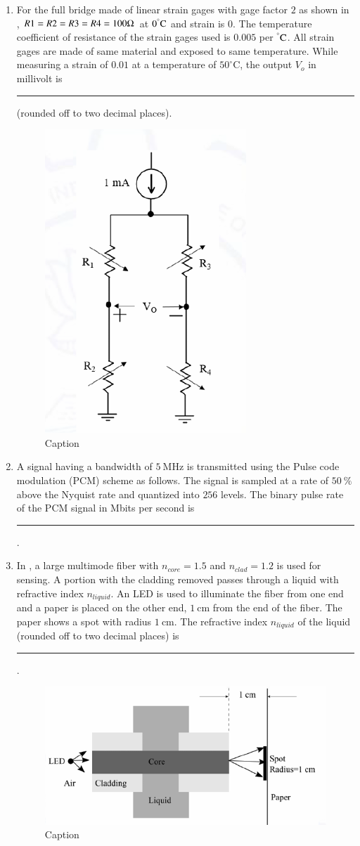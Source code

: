 \documentclass[journal,12pt,onecolumn]{IEEEtran}
\theoremstyle{remark}
\begin{document}
\begin{enumerate}
\item For the full bridge made of linear strain gages with gage factor $2$ as shown in , $R1 = R2 = R3 = R4 = 100\ohm$ at $0^\degree\text{C}$ and strain is $0$. The temperature coefficient of resistance of the strain gages used is $0.005$ per $^\degree \text{C}$.
All strain gages are made of same material and exposed to same
temperature. While measuring a strain of $0.01$ at a temperature of $50^\circ \text{C}$, the
output $V_o$ in millivolt is \rule{1.5cm}{0.4pt} (rounded off to two decimal places). \par \hfill{}
\begin{figure}[H]
    \centering
    \includegraphics[width=0.3\linewidth]{Figs/Q-53.png}
    \caption{Caption}
    \label{53}
\end{figure}

\item A signal having a bandwidth of $5\ \text{MHz}$ is transmitted using the Pulse code modulation (PCM) scheme as follows. The signal is sampled at a rate of $50\ \%$ above the Nyquist rate and quantized into $256$ levels. The binary pulse rate of the PCM signal in Mbits per second is \rule{1.5cm}{0.4pt}. \par \hfill{}

\item In , a large multimode fiber with $n_{core} = 1.5$ and $n_{clad} =1.2$ is used for sensing. A portion with the cladding removed passes through a liquid with refractive index $n_{liquid}$. An LED is used to illuminate the fiber from one end and a paper is placed on the other end, $1\ \text{cm}$ from the end of the fiber. The paper shows a spot with radius $1\ \text{cm}$. The refractive index $n_{liquid}$ of the liquid (rounded off to two decimal places) is \rule{1.5cm}{0.4pt}. \par \hfill{}
\begin{figure}[H]
    \centering
    \includegraphics[width=0.5\linewidth]{Figs/Q-55.png}
    \caption{Caption}
    \label{55}
\end{figure}

\end{enumerate}
\end{document}
